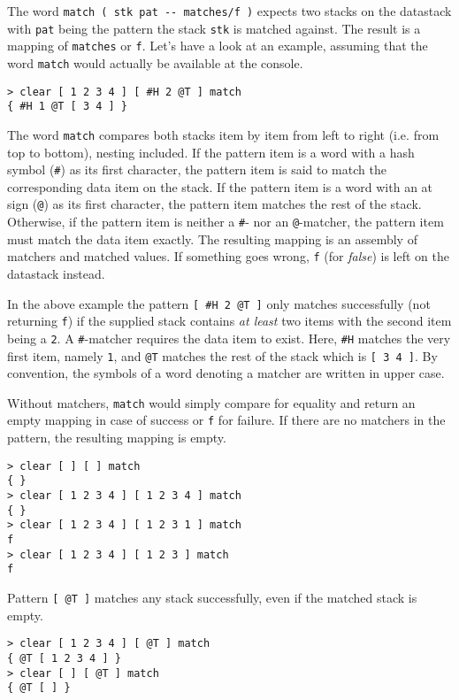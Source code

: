 The word \verb|match ( stk pat -- matches/f )| expects two stacks on the datastack with \verb|pat| being the pattern the stack \verb|stk| is matched against. The result is a mapping of \verb|matches| or \verb|f|. Let's have a look at an example, assuming that the word \verb|match| would actually be available at the console. 

\begin{verbatim}
> clear [ 1 2 3 4 ] [ #H 2 @T ] match
{ #H 1 @T [ 3 4 ] }
\end{verbatim}

The word \verb|match| compares both stacks item by item from left to right (i.e. from top to bottom), nesting included. If the pattern item is a word with a hash symbol (\verb|#|) as its first character, the pattern item is said to match the corresponding data item on the stack. If the pattern item is a word with an at sign (\verb|@|) as its first character, the pattern item matches the rest of the stack. Otherwise, if the pattern item is neither a \verb|#|- nor an \verb|@|-matcher, the pattern item must match the data item exactly. The resulting mapping is an assembly of matchers and matched values. If something goes wrong, \verb|f| (for \emph{false}) is left on the datastack instead.

In the above example the pattern \verb|[ #H 2 @T ]| only matches successfully (not returning \verb|f|) if the supplied stack contains \emph{at least} two items with the second item being a \verb|2|. A \verb|#|-matcher requires the data item to exist.
Here, \verb|#H| matches the very first item, namely \verb|1|, and \verb|@T| matches the rest of the stack which is \verb|[ 3 4 ]|. By convention, the symbols of a word denoting a matcher are written in upper case.

Without matchers, \verb|match| would simply compare for equality and return an empty mapping in case of success or \verb|f| for failure. If there are no matchers in the pattern, the resulting mapping is empty.

\begin{verbatim}
> clear [ ] [ ] match
{ }
> clear [ 1 2 3 4 ] [ 1 2 3 4 ] match
{ }
> clear [ 1 2 3 4 ] [ 1 2 3 1 ] match
f
> clear [ 1 2 3 4 ] [ 1 2 3 ] match
f
\end{verbatim}

Pattern \verb|[ @T ]| matches any stack successfully, even if the matched stack is empty.

\begin{verbatim}
> clear [ 1 2 3 4 ] [ @T ] match
{ @T [ 1 2 3 4 ] }
> clear [ ] [ @T ] match
{ @T [ ] }
\end{verbatim}

